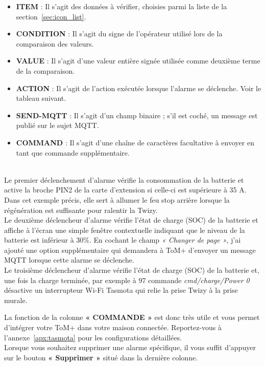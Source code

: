 \begin{itemize}
    \item \textbf{ITEM} : Il s'agit des données à vérifier, choisies parmi la liste de la section~\ref{sec:icon_list}.
    \item \textbf{CONDITION} : Il s'agit du signe de l'opérateur utilisé lors de la comparaison des valeurs.
    \item \textbf{VALUE} : Il s’agit d’une valeur entière signée utilisée comme deuxième terme de la comparaison.
    \item \textbf{ACTION} : Il s’agit de l’action exécutée lorsque l’alarme se déclenche. Voir le tableau suivant.
    \item \textbf{SEND-MQTT} : Il s’agit d’un champ binaire ; s’il est coché, un message est publié sur le sujet MQTT.
    \item \textbf{COMMAND} : Il s’agit d’une chaîne de caractères facultative à envoyer en tant que commande supplémentaire.
\end{itemize}
\  \\
Le premier déclenchement d’alarme vérifie la consommation de la batterie et active la broche PIN2 de la 
carte d’extension si celle-ci est supérieure à 35 A. Dans cet exemple précis, elle sert à allumer
le feu stop arrière lorsque la régénération est suffisante pour ralentir la Twizy.\\

Le deuxième déclencheur d’alarme vérifie l’état de charge (SOC) de la batterie et affiche à l’écran une simple fenêtre contextuelle
indiquant que le niveau de la batterie est inférieur à 30\%. En cochant le champ \textit{« Changer de page »},
j’ai ajouté une option supplémentaire qui demandera à ToM+ d’envoyer un message MQTT lorsque cette alarme se déclenche.\\

Le troisième déclencheur d’alarme vérifie l’état de charge (SOC) de la batterie et, une fois la charge terminée,
par exemple à 97 %
commande \textit{cmd/charge/Power 0} désactive un interrupteur Wi-Fi Tasmota qui relie la
prise Twizy à la prise murale.

La fonction de la colonne \textbf{« COMMANDE »} est donc très utile et vous permet d’intégrer 
votre ToM+ dans votre maison connectée. Reportez-vous à l’annexe~\ref{apx:tasmota} pour les configurations détaillées.\\

Lorsque vous souhaitez supprimer une alarme spécifique, il vous suffit d’appuyer sur le bouton \textbf{« Supprimer »} situé dans la dernière colonne.\\


